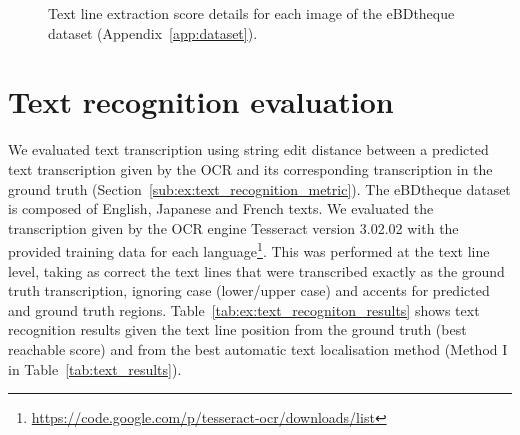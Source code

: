 \begin{figure}[!ht]
  \caption[Text line extraction score details for each image of the eBDtheque dataset]{Text line extraction score details for each image of the eBDtheque dataset (Appendix~\ref{app:dataset}).}
    \label{fig:ex:text_detection_result_details}
\end{figure}

\section{Text recognition evaluation} %
\label{par:ex:text_recognition_evaluation}

We evaluated text transcription using string edit distance between a predicted text transcription given by the OCR and its corresponding transcription in the ground truth (Section~\ref{sub:ex:text_recognition_metric}).
The eBDtheque dataset is composed of English, Japanese and French texts.
We evaluated the transcription given by the OCR engine Tesseract version 3.02.02 with the provided training data for each language\footnote{\url{https://code.google.com/p/tesseract-ocr/downloads/list}}.
This was performed at the text line level, taking as correct the text lines that were transcribed exactly as the ground truth transcription, ignoring case (lower/upper case) and accents for predicted and ground truth regions.
Table~\ref{tab:ex:text_recogniton_results} shows text recognition results given the text line position from the ground truth (best reachable score) and from the best automatic text localisation method (Method I in Table~\ref{tab:text_results}).

